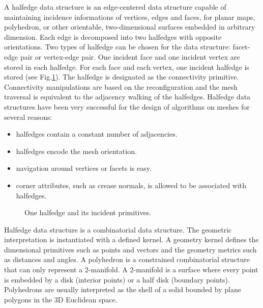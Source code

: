 A halfedge data structure \cite{hds} is an edge-centered data
structure capable of maintaining incidence informations of vertices,
edges and faces, for planar maps, polyhedron, or other orientable,
two-dimensional surfaces embedded in arbitrary dimension. Each edge is
decomposed into two halfedges with opposite orientations.  Two types
of halfedge can be chosen for the data structure: facet-edge pair or
vertex-edge pair.  One incident face and one incident vertex are
stored in each halfedge. For each face and each vertex, one incident
halfedge is stored (see Fig.\ref{fig:halfedge}). The halfedge is
designated as the connectivity primitive. Connectivity manipulations
are based on the reconfiguration and the mesh traversal is equivalent
to the adjacency walking of the halfedges. Halfedge data structures
have been very successful for the design of algorithms on meshes for
several reasons:
\begin{itemize}
\item halfedges contain a constant number of adjacencies. 
\item halfedges encode the mesh orientation.
\item navigation around vertices or facets is easy.
\item corner attributes, such as crease normals, is allowed 
      to be associated with halfedges.
\end{itemize}

\begin{figure}[htb]
    \caption{One halfedge and its incident primitives.}
    \label{fig:halfedge}
\end{figure}

Halfedge data structure is a combinatorial data structure.  The
geometric interpretation is instantiated with a defined kernel. A
geometry kernel defines the dimensional primitives such as points and
vectors and the geometry metrics such as distances and angles. A
polyhedron is a constrained combinatorial structure that can only
represent a 2-manifold. A 2-manifold is a surface where every point is
embedded by a disk (interior points) or a half disk (boundary
points). Polyhedrons are usually interpreted as the shell of a solid
bounded by plane polygons in the 3D Euclidean space.

